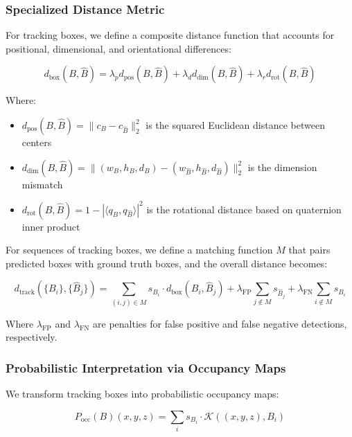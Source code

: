 \subsubsection{Specialized Distance Metric}

For tracking boxes, we define a composite distance function that accounts for positional, dimensional, and orientational differences:

\begin{equation}
d_{\text{box}}(B, \hat{B}) = \lambda_p d_{\text{pos}}(B, \hat{B}) + \lambda_d d_{\text{dim}}(B, \hat{B}) + \lambda_r d_{\text{rot}}(B, \hat{B})
\end{equation}

Where:
\begin{itemize}
\item $d_{\text{pos}}(B, \hat{B}) = \|c_B - c_{\hat{B}}\|_2^2$ is the squared Euclidean distance between centers
\item $d_{\text{dim}}(B, \hat{B}) = \|(w_B, h_B, d_B) - (w_{\hat{B}}, h_{\hat{B}}, d_{\hat{B}})\|_2^2$ is the dimension mismatch
\item $d_{\text{rot}}(B, \hat{B}) = 1 - |\langle q_B, q_{\hat{B}} \rangle|^2$ is the rotational distance based on quaternion inner product
\end{itemize}

For sequences of tracking boxes, we define a matching function $M$ that pairs predicted boxes with ground truth boxes, and the overall distance becomes:

\begin{equation}
d_{\text{track}}(\{B_i\}, \{\hat{B}_j\}) = \sum_{(i,j) \in M} s_{B_i} \cdot d_{\text{box}}(B_i, \hat{B}_j) + \lambda_{\text{FP}} \sum_{j \not\in M} s_{\hat{B}_j} + \lambda_{\text{FN}} \sum_{i \not\in M} s_{B_i}
\end{equation}

Where $\lambda_{\text{FP}}$ and $\lambda_{\text{FN}}$ are penalties for false positive and false negative detections, respectively.

\subsubsection{Probabilistic Interpretation via Occupancy Maps}

We transform tracking boxes into probabilistic occupancy maps:

\begin{equation}
P_{\text{occ}}(B)(x,y,z) = \sum_i s_{B_i} \cdot \mathcal{K}((x,y,z), B_i)
\end{equation}


